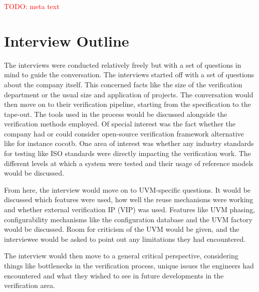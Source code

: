 \documentclass[11pt,a4paper]{report}
\newcommand{\todo}[1]{\textcolor{red}{TODO: #1}}
\begin{document}
\todo{meta text}

\section{Interview Outline} %

The interviews were conducted relatively freely but with a set of questions in mind to guide the conversation. The
interviews started off with a set of questions about the company itself. This concerned facts like the size of the
verification department or the usual size and application of projects. The conversation would then move on to their
verification pipeline, starting from the specification to the tape-out. The tools used in the process would be
discussed alongside the verification methods employed. Of special interest was the fact whether the company had or
could consider open-source verification framework alternative like for instance cocotb. One area of interest was
whether any industry standards for testing like ISO standards were directly impacting the verification work. The
different levels at which a system were tested and their usage of reference models would be discussed.

From here, the interview would move on to UVM-specific questions. It would be discussed which features were used, how
well the reuse mechanisms were working and whether external verification IP (VIP) was used. Features like UVM
phasing, configurability mechanisms like the configuration database and the UVM factory would be discussed. Room for
criticism of the UVM would be given, and the interviewee would be asked to point out any limitations they had encountered.

The interview would then move to a general critical perspective, considering things like bottlenecks in the
verification process, unique issues the engineers had encountered and what they wished to see in future developments
in the verification area.
\end{document}
